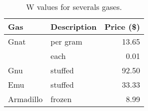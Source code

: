 \begin{table}[ht]
	\centering
	\caption[W values for severals gases]
	{W values for severals gases.}
	\label{}
	\begin{tabular}{llr}
		\toprule
		Gas       & Description & Price (\$) \\
		\midrule
		Gnat      & per gram    & 13.65      \\
		          & each        & 0.01       \\
		Gnu       & stuffed     & 92.50      \\
		Emu       & stuffed     & 33.33      \\
		Armadillo & frozen      & 8.99       \\
		\bottomrule
	\end{tabular}
\end{table}